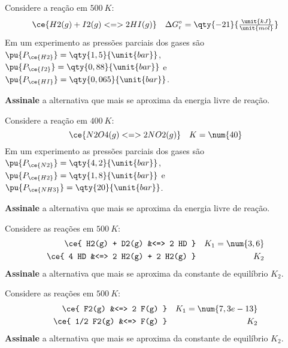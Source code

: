 \begin{problem}[
	id={2F13},
	path={/home/braun/Documents/Developer/braunchem/data/problems/Q2/2F/2F13}
]
Considere a reação em {\(\qty{500}{\unit{K}}\)}: {\[
    \ce{ H2(g) + I2(g) <=> 2 HI(g) } \quad \Delta
G^\circ_\mathrm{r} = \qty{-21}{\tfrac{\unit{kJ}}{\unit{mol}}}
\]} Em um experimento as pressões parciais dos gases são {\(\pu{P_{\ce{H2}}} = \qty{1,5}{\unit{bar}}\)},
{\(\pu{P_{\ce{I2}}} = \qty{0,88}{\unit{bar}}\)} e {\(\pu{P_{\ce{HI}}} = \qty{0,065}{\unit{bar}}\)}.

\textbf{Assinale} a alternativa que mais se aproxima da energia livre de reação.
\end{problem}


\begin{problem}[
	id={2F14},
	path={/home/braun/Documents/Developer/braunchem/data/problems/Q2/2F/2F14}
]
Considere a reação em {\(\qty{400}{\unit{K}}\)}: {\[
    \ce{ N2O4(g) <=> 2 NO2(g) } \quad K = \num{40}
\]} Em um experimento as pressões parciais dos gases são {\(\pu{P_{\ce{N2}}} = \qty{4,2}{\unit{bar}}\)},
{\(\pu{P_{\ce{H2}}} = \qty{1,8}{\unit{bar}}\)} e {\(\pu{P_{\ce{NH3}}} = \qty{20}{\unit{bar}}\)}.

\textbf{Assinale} a alternativa que mais se aproxima da energia livre de reação.
\end{problem}


\begin{problem}[
	id={2F15},
	path={/home/braun/Documents/Developer/braunchem/data/problems/Q2/2F/2F15}
]
Considere as reações em {\(\qty{500}{\unit{K}}\)}: {\[
\begin{aligned}
    \ce{ H2(g) + D2(g) &<=> 2 HD } && K_1 = \num{3,6}
\\
    \ce{ 4 HD &<=> 2 H2(g) + 2 H2(g) } && K_2
\end{aligned}
\]} \textbf{Assinale} a alternativa que mais se aproxima da constante de equilíbrio {\(K_2\)}.
\end{problem}


\begin{problem}[
	id={2F16},
	path={/home/braun/Documents/Developer/braunchem/data/problems/Q2/2F/2F16}
]
Considere as reações em {\(\qty{500}{\unit{K}}\)}: {\[
\begin{aligned}
    \ce{ F2(g) &<=> 2 F(g) } && K_1 = \num{7,3e-13} \\
    \ce{ 1/2 F2(g) &<=> F(g) } && K_2
\end{aligned}
\]} \textbf{Assinale} a alternativa que mais se aproxima da constante de equilíbrio {\(K_2\)}.
\end{problem}


